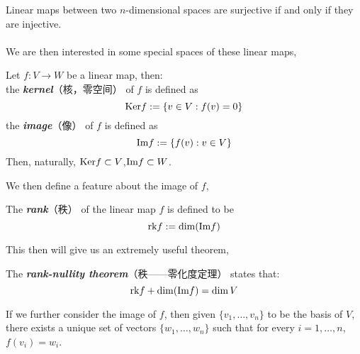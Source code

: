 Linear maps between two $n$-dimensional spaces are surjective if and only if they are injective. \\
\\
We are then interested in some special spaces of these linear maps, 
\begin{definition}
    Let $f: V \to W$ be a linear map, then: \\
    the \textbf{\textit{kernel}}（核，零空间） of $f$ is defined as
    $$\text{Ker} f := \{v \in V: f(v) = 0\}$$
    the \textbf{\textit{image}}（像） of $f$ is defined as
    $$\text{Im} f := \{f(v): v \in V\}$$
    Then, naturally, $\text{Ker} f \subset V$,$\text{Im} f \subset W$.
\end{definition}
We then define a feature about the image of $f$,
\begin{definition}
    The \textbf{\textit{rank}}（秩） of the linear map $f$ is defined to be
    $$\text{rk} f := \dim (\text{Im} f)$$
\end{definition}
This then will give us an extremely useful theorem,
\begin{theorem}
    The \textbf{\textit{rank-nullity theorem}}（秩——零化度定理） states that:
    $$\text{rk} f + \dim (\text{Im} f) = \dim V$$
\end{theorem}
If we further consider the image of $f$, then given $\{v_1,\dots,v_n\}$ to be the basis of $V$, there exists a unique set of vectors $\{w_1, \dots, w_n\}$ such that for every $i=1,\dots, n$, $f(v_i)=w_i$.

